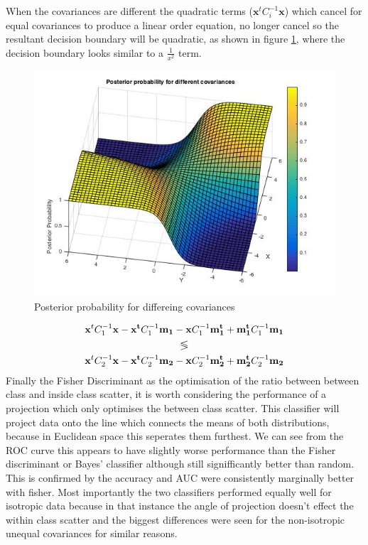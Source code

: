 \documentclass[a4paper,11pt, twocolumn]{article}
\begin{document}
When the covariances are different the quadratic terms ($\mathbf{x}^tC_i^{-1}\mathbf{x}$) which cancel for equal covariances to produce a linear order equation, no longer cancel so the resultant decision boundary will be quadratic, as shown in figure \ref{figure:BayesQuadratic}, where the decision boundary looks similar to a $\frac{1}{x^2}$ term.

\begin{figure}[ht]
	\includegraphics[width=0.7\linewidth]{3dQuadratic.jpg}
	\centering
	\caption{Posterior probability for differeing covariances}
    \label{figure:BayesQuadratic}
\end{figure}

\begin{gather}
	\mathbf{x}^tC_1^{-1}\mathbf{x} - \mathbf{x^t}C_1^{-1}\mathbf{m_1} - \mathbf{x}C_1^{-1}\mathbf{m_1^t} + \mathbf{m_1^t}C_1^{-1}\mathbf{m_1} \notag\\
	\lessgtr \\
	\mathbf{x}^tC_2^{-1}\mathbf{x}-\mathbf{x^t}C_2^{-1}\mathbf{m_2} -\mathbf{x}C_2^{-1}\mathbf{m_2^t} + \mathbf{m_2^t}C_2^{-1}\mathbf{m_2} \notag
\end{gather}
Finally the Fisher Discriminant as the optimisation of the ratio between between class and inside class scatter, it is worth considering the performance of a projection which only optimises the between class scatter. This classifier will project data onto the line which connects the means of both distributions, because in Euclidean space this seperates them furthest. We can see from the ROC curve this appears to have slightly worse performance than the Fisher discriminant or Bayes' classifier although still signifficantly better than random. This is confirmed by the accuracy and AUC were consistently marginally better with fisher. Most importantly the two classifiers performed equally well for isotropic data because in that instance the angle of projection doesn't effect the within class scatter and the biggest differences were seen for the non-isotropic unequal covariances for similar reasons. 
\end{document}
